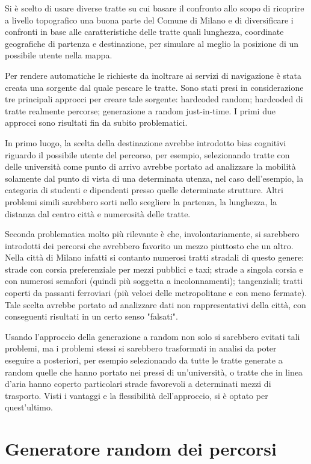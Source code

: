 Si è scelto di usare diverse tratte su cui basare il confronto allo scopo di ricoprire a livello topografico una buona parte del Comune di Milano e di diversificare i confronti in base alle caratteristiche delle tratte quali lunghezza, coordinate geografiche di partenza e destinazione, per simulare al meglio la posizione di un possibile utente nella mappa.

Per rendere automatiche le richieste da inoltrare ai servizi di navigazione è stata creata una sorgente dal quale pescare le tratte. Sono stati presi in considerazione tre principali approcci per creare tale sorgente: hardcoded random; hardcoded di tratte realmente percorse; generazione a random just-in-time. I primi due approcci sono risultati fin da subito problematici.

In primo luogo, la scelta della destinazione avrebbe introdotto bias cognitivi riguardo il possibile utente del percorso, per esempio, selezionando tratte con delle università come punto di arrivo avrebbe portato ad analizzare la mobilità solamente dal punto di vista di una determinata utenza, nel caso dell'esempio, la categoria di studenti e dipendenti presso quelle determinate strutture. Altri problemi simili sarebbero sorti nello scegliere la partenza, la lunghezza, la distanza dal centro città e numerosità delle tratte.

Seconda problematica molto più rilevante è che, involontariamente, si sarebbero introdotti dei percorsi che avrebbero favorito un mezzo piuttosto che un altro. Nella città di Milano infatti si contanto numerosi tratti stradali di questo genere: strade con corsia preferenziale per mezzi pubblici e taxi; strade a singola corsia e con numerosi semafori (quindi più soggetta a incolonnamenti); tangenziali; tratti coperti da passanti ferroviari (più veloci delle metropolitane e con meno fermate). Tale scelta avrebbe portato ad analizzare dati non rappresentativi della città, con conseguenti risultati in un certo senso "falsati".

Usando l'approccio della generazione a random non solo si sarebbero evitati tali problemi, ma i problemi stessi si sarebbero trasformati in analisi da poter eseguire a posteriori, per esempio selezionando da tutte le tratte generate a random quelle che hanno portato nei pressi di un'università, o tratte che in linea d'aria hanno coperto particolari strade favorevoli a determinati mezzi di trasporto. Visti i vantaggi e la flessibilità dell'approccio, si è optato per quest'ultimo.

\section{Generatore random dei percorsi}

